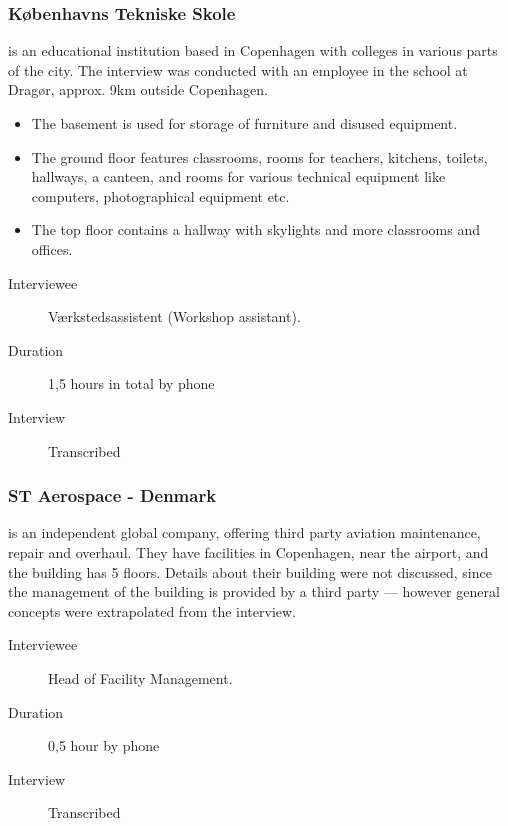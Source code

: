 \subsubsection{K\o benhavns Tekniske Skole} is an educational institution based in Copenhagen with colleges in various parts of the city. The interview was conducted with an employee in the school at Drag\o r, approx. 9km outside Copenhagen.
\begin{itemize}
	\item The basement is used for storage of furniture and disused equipment.
	\item The ground floor features classrooms, rooms for teachers, kitchens, toilets, hallways, a canteen, and rooms for various technical equipment like computers, photographical equipment etc.
	\item The top floor contains a hallway with skylights and more classrooms and offices.
\end{itemize}
\begin{description}
	\item[Interviewee] V\ae rkstedsassistent (Workshop assistant).
	\item[Duration] 1,5 hours in total by phone
	\item[Interview] Transcribed
\end{description}

\subsubsection{ST Aerospace - Denmark} is an independent global company, offering third party aviation maintenance, repair and overhaul. They have facilities in Copenhagen, near the airport, and the building has 5 floors. Details about their building were not discussed, since the management of the building is provided by a third party --- however general concepts were extrapolated from the interview.
\begin{description}
	\item[Interviewee] Head of Facility Management.
	\item[Duration] 0,5 hour by phone
	\item[Interview] Transcribed
\end{description}

